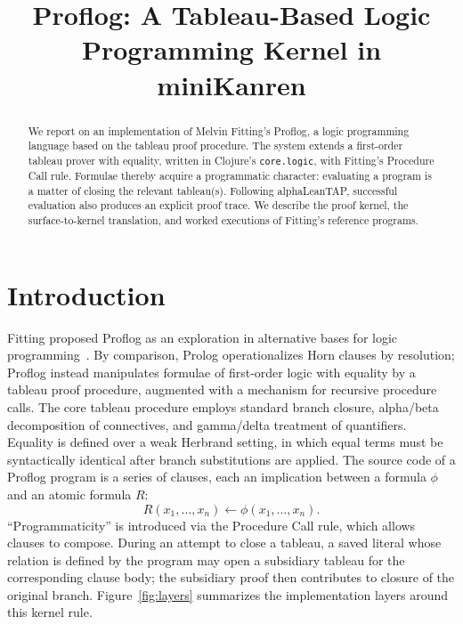 \documentclass[acmsmall,screen,review,anonymous]{acmart}
\title{Proflog: A Tableau-Based Logic Programming Kernel in miniKanren}
\begin{document}
\begin{abstract}
We report on an implementation of Melvin Fitting's Proflog, a logic programming
language based on the tableau proof procedure.  The system extends a first-order
tableau prover with equality, written in Clojure's \texttt{core.logic}, with
Fitting's Procedure Call rule.  Formulae thereby acquire a programmatic
character: evaluating a program is a matter of closing the relevant
tableau(s).  Following alphaLeanTAP, successful evaluation also produces an
explicit proof trace.  We describe the proof kernel, the surface-to-kernel
translation, and worked executions of Fitting's reference programs.
\end{abstract}



\maketitle

\section{Introduction}

Fitting proposed Proflog as an exploration in alternative bases for logic
programming~\cite{fitting1994tableaux}.  By comparison, Prolog
operationalizes Horn clauses by resolution; Proflog instead manipulates
formulae of first-order logic with equality by a tableau proof procedure,
augmented with a mechanism for recursive procedure calls.  The core tableau
procedure employs standard branch closure, alpha/beta decomposition of
connectives, and gamma/delta treatment of quantifiers.  Equality is defined
over a weak Herbrand setting, in which equal terms must be syntactically
identical after branch substitutions are applied.  The source code of a Proflog
program is a series of clauses, each an implication between a formula \(\phi\)
and an atomic formula \(R\):
\[
  R(x_1,\ldots,x_n) \leftarrow \phi(x_1,\ldots,x_n).
\]
``Programmaticity'' is introduced via the Procedure Call rule, which allows
clauses to compose.  During an attempt to close a tableau, a saved literal
whose relation is defined by the program may open a subsidiary tableau for the
corresponding clause body; the subsidiary proof then contributes to closure of
the original branch.  Figure~\ref{fig:layers} summarizes the implementation
layers around this kernel rule.
\end{document}
